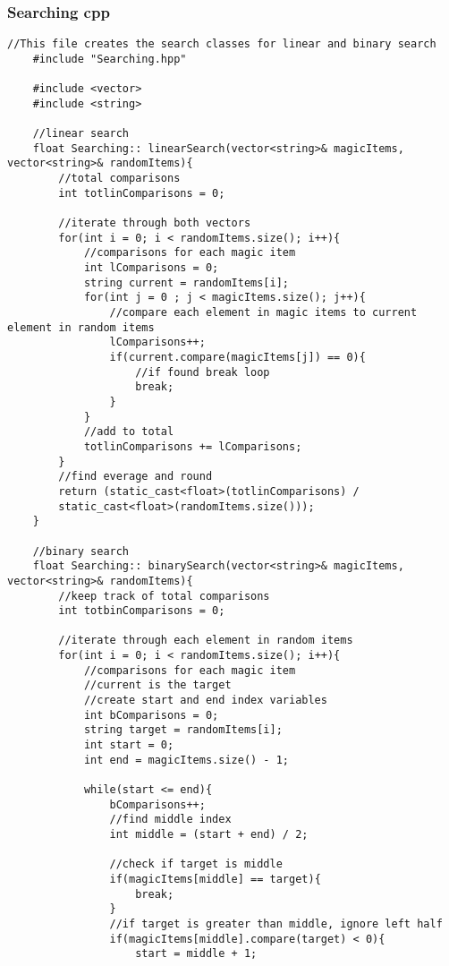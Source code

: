 \documentclass[letterpaper, 10pt,DIV=13]{scrartcl}
\numberwithin{equation}{section} %
\numberwithin{figure}{section} %
\numberwithin{table}{section} %
\begin{document}
\subsubsection*{Searching cpp}
    \lstset{numbers=left, numberstyle=\tiny, stepnumber=1, numbersep=5pt, basicstyle=\footnotesize\ttfamily}
    \begin{lstlisting}[frame=single, ]
    //This file creates the search classes for linear and binary search
    #include "Searching.hpp"
    
    #include <vector>
    #include <string>
    
    //linear search
    float Searching:: linearSearch(vector<string>& magicItems, vector<string>& randomItems){
        //total comparisons
        int totlinComparisons = 0;
    
        //iterate through both vectors
        for(int i = 0; i < randomItems.size(); i++){
            //comparisons for each magic item
            int lComparisons = 0;
            string current = randomItems[i];
            for(int j = 0 ; j < magicItems.size(); j++){
                //compare each element in magic items to current element in random items
                lComparisons++;
                if(current.compare(magicItems[j]) == 0){
                    //if found break loop
                    break;
                }
            }
            //add to total
            totlinComparisons += lComparisons;
        }
        //find everage and round
        return (static_cast<float>(totlinComparisons) / 
        static_cast<float>(randomItems.size()));
    }
    
    //binary search
    float Searching:: binarySearch(vector<string>& magicItems, vector<string>& randomItems){
        //keep track of total comparisons
        int totbinComparisons = 0;
        
        //iterate through each element in random items
        for(int i = 0; i < randomItems.size(); i++){
            //comparisons for each magic item
            //current is the target
            //create start and end index variables
            int bComparisons = 0;
            string target = randomItems[i];
            int start = 0;
            int end = magicItems.size() - 1;
    
            while(start <= end){
                bComparisons++;
                //find middle index
                int middle = (start + end) / 2;
    
                //check if target is middle
                if(magicItems[middle] == target){
                    break;
                }
                //if target is greater than middle, ignore left half
                if(magicItems[middle].compare(target) < 0){
                    start = middle + 1;
    

\end{lstlisting}
\end{document}
